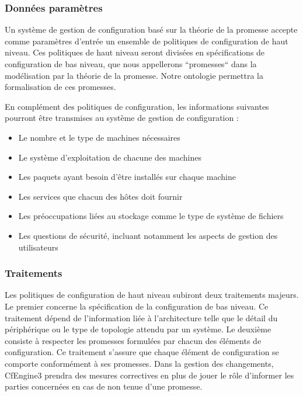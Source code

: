 \subsubsection{Données paramètres}

Un système de gestion de configuration basé sur la théorie de la promesse
accepte comme paramètres d'entrée un ensemble de politiques de configuration de
haut niveau. Ces politiques de haut niveau seront divisées en spécifications de
configuration de bas niveau, que nous appellerons ``promesses`` dans la
modélisation par la théorie de la promesse. Notre ontologie permettra la
formalisation de ces promesses.

En complément des politiques de configuration, les informations suivantes
pourront être transmises au système de gestion de configuration :

\begin{itemize}
    \item Le nombre et le type de machines nécessaires
    \item Le système d'exploitation de chacune des machines
    \item Les paquets ayant besoin d'être installés sur chaque machine
    \item Les services que chacun des hôtes doit fournir
    \item Les préoccupations liées au stockage comme le type de système de
        fichiers
    \item Les questions de sécurité, incluant notamment les aspects de gestion
        des utilisateurs
\end{itemize}

\subsubsection{Traitements}

Les politiques de configuration de haut niveau subiront deux traitements
majeurs. Le premier concerne la spécification de la configuration de bas
niveau. Ce traitement dépend de l'information liée à l'architecture telle que le
détail du périphérique ou le type de topologie attendu par un système.
Le deuxième consiste à respecter les promesses formulées par chacun des éléments
de configuration. Ce traitement s'assure que chaque élément de configuration se
comporte conformément à ses promesses. Dans la gestion des changements,
CfEngine3 prendra des mesures correctives en plus de jouer le rôle d'informer
les parties concernées en cas de non tenue d'une promesse.

